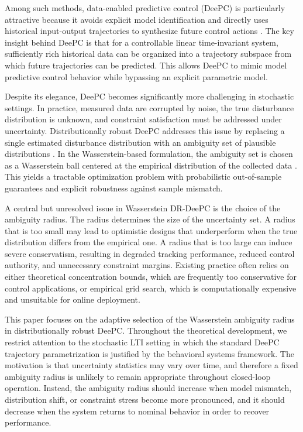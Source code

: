 \documentclass[conference]{IEEEtran}
\begin{document}
Among such methods, data-enabled predictive control (DeePC) is particularly attractive because it avoids explicit model identification and directly uses historical input-output trajectories to synthesize future control actions \cite{Coulson2019DeePC}. The key insight behind DeePC is that for a controllable linear time-invariant system, sufficiently rich historical data can be organized into a trajectory subspace from which future trajectories can be predicted. This allows DeePC to mimic model predictive control behavior while bypassing an explicit parametric model.

Despite its elegance, DeePC becomes significantly more challenging in stochastic settings. In practice, measured data are corrupted by noise, the true disturbance distribution is unknown, and constraint satisfaction must be addressed under uncertainty. Distributionally robust DeePC addresses this issue by replacing a single estimated disturbance distribution with an ambiguity set of plausible distributions \cite{Coulson2019Regularized,Coulson2022DRCCDeePC}. In the Wasserstein-based formulation, the ambiguity set is chosen as a Wasserstein ball centered at the empirical distribution of the collected data \cite{EsfahaniKuhn2018}. This yields a tractable optimization problem with probabilistic out-of-sample guarantees and explicit robustness against sample mismatch.

A central but unresolved issue in Wasserstein DR-DeePC is the choice of the ambiguity radius. The radius determines the size of the uncertainty set. A radius that is too small may lead to optimistic designs that underperform when the true distribution differs from the empirical one. A radius that is too large can induce severe conservatism, resulting in degraded tracking performance, reduced control authority, and unnecessary constraint margins. Existing practice often relies on either theoretical concentration bounds, which are frequently too conservative for control applications, or empirical grid search, which is computationally expensive and unsuitable for online deployment.

This paper focuses on the adaptive selection of the Wasserstein ambiguity radius in distributionally robust DeePC. Throughout the theoretical development, we restrict attention to the stochastic LTI setting in which the standard DeePC trajectory parametrization is justified by the behavioral systems framework. The motivation is that uncertainty statistics may vary over time, and therefore a fixed ambiguity radius is unlikely to remain appropriate throughout closed-loop operation. Instead, the ambiguity radius should increase when model mismatch, distribution shift, or constraint stress become more pronounced, and it should decrease when the system returns to nominal behavior in order to recover performance.
\end{document}
